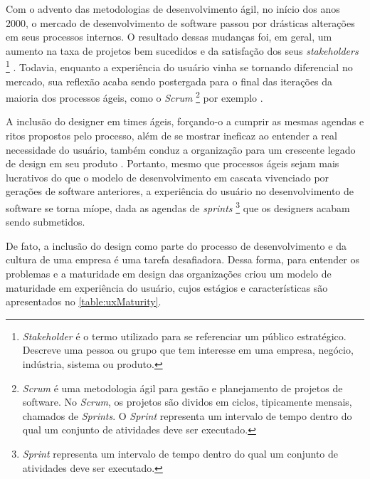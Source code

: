 Com o advento das metodologias de desenvolvimento ágil, no início dos anos 2000, o mercado de desenvolvimento de software passou por drásticas alterações em seus processos internos. O resultado dessas mudanças foi, em geral, um aumento na taxa de projetos bem sucedidos e da satisfação dos seus \textit{stakeholders} \footnote{\textit{Stakeholder} é o termo utilizado para se referenciar um público estratégico. Descreve uma pessoa ou grupo que tem interesse em uma empresa, negócio, indústria, sistema ou produto.} \cite{serrador2015does}. Todavia, enquanto a experiência do usuário vinha se tornando diferencial no mercado, sua reflexão acaba sendo postergada para o final das iterações da maioria dos processos ágeis, como o \textit{Scrum} \footnote{\textit{Scrum} é uma metodologia ágil para gestão e planejamento de projetos de software. No \textit{Scrum}, os projetos são dividos em ciclos, tipicamente mensais, chamados de \textit{Sprints}. O \textit{Sprint} representa um intervalo de tempo dentro do qual um conjunto de atividades deve ser executado.} por exemplo \cite{ruissalo2018operating}.

A inclusão do designer em times ágeis, forçando-o a cumprir as mesmas agendas e ritos propostos pelo processo, além de se mostrar ineficaz ao entender a real necessidade do usuário, também conduz a organização para um crescente legado de design em seu produto \cite{ruissalo2018operating}. Portanto, mesmo que processos ágeis sejam mais lucrativos do que o modelo de desenvolvimento em cascata vivenciado por gerações de software anteriores, a experiência do usuário no desenvolvimento de software se torna míope, dada as agendas de \textit{sprints} \footnote{\textit{Sprint} representa um intervalo de tempo dentro do qual um conjunto de atividades deve ser executado.} que os designers acabam sendo submetidos.

De fato, a inclusão do design como parte do processo de desenvolvimento e da cultura de uma empresa é uma tarefa desafiadora. Dessa forma, para entender os problemas e a maturidade em design das organizações  criou um modelo de maturidade em experiência do usuário, cujos estágios e características são apresentados no \autoref{table:uxMaturity}.


